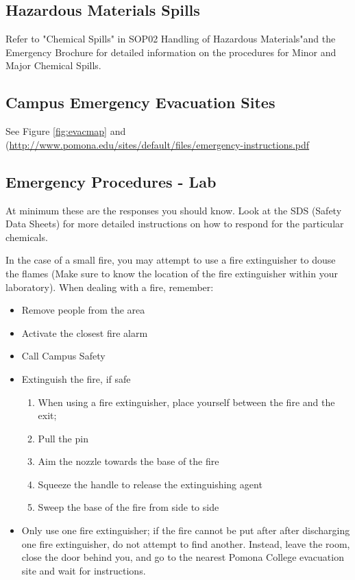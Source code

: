\documentclass[12pt]{../SOP4_alpha}\usepackage[]{graphicx}\usepackage[]{color}
\begin{document}
\subsection{Hazardous Materials Spills}

\NP Refer to "Chemical Spills" in SOP02 Handling of Hazardous Materials"and the Emergency Brochure for detailed information on the procedures for Minor and Major Chemical Spills.

\subsection{Campus Emergency Evacuation Sites}

See Figure \ref{fig:evacmap} and (\href{Pomona College Emergiency Instruction}{http://www.pomona.edu/sites/default/files/emergency-instructions.pdf}

\subsection*{Emergency Procedures - Lab}

\NP At minimum these are the responses you should know. Look at the SDS (Safety Data Sheets) for more detailed instructions on how to respond for the particular chemicals.  

\NP In the case of a small fire, you may attempt to use a fire extinguisher to douse the flames (Make sure to know the location of the fire extinguisher within your laboratory). 
When dealing with a fire, remember:

\begin{itemize}
  \item Remove people from the area
  \item Activate the closest fire alarm
  \item Call Campus Safety
  \item Extinguish the fire, if safe
    \begin{enumerate}
      \item When using a fire extinguisher, place yourself between the fire and the exit; 
	    \item Pull the pin
	    \item Aim the nozzle towards the base of the fire
	    \item Squeeze the handle to release the extinguishing agent
	    \item Sweep the base of the fire from side to side
    \end{enumerate}

  \item Only use one fire extinguisher; if the fire cannot be put after after discharging one fire extinguisher, do not attempt to find another. Instead, leave the room, close the door behind you, and go to the nearest Pomona College evacuation site and wait for instructions.
  
\end{itemize}
\end{document}
